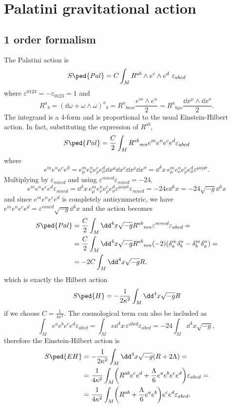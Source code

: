 \documentclass[a4paper,12pt]{book}
\begin{document}
\section{Palatini gravitational action}
\subsection{1 order formalism}
\label{subsec:pal1vierbein}
The Palatini action is 
\[S\ped{Pal}=C\int_MR^{ab}\wedge e^c\wedge e^d\ \varepsilon_{abcd}\]
where $\varepsilon^{0123}=-\varepsilon_{0123}=1$ and
\[R^a{}_b=(\dd\omega+\omega\wedge\omega)^a{}_b=R^a{}_{bmn}\frac{e^m\wedge e^n}{2}=R^a{}_{b\mu\nu}\frac{\dd x^\mu\wedge\dd x^\nu}{2}.\]
The integrand is a 4-form and is proportional to the usual Einstein-Hilbert action. In fact, substituting the expression of $R^{ab}$,
\[S\ped{Pal}=\frac{C}{2}\int_MR^{ab}{}_{mn}e^me^ne^ce^d\varepsilon_{abcd}\]
where
\[e^me^ne^ce^d=e^m_\mu e^n_\nu e^c_\rho e^d_\sigma\dd x^\mu\dd x^\nu\dd x^\rho\dd x^\sigma=\dd^4x\,e^m_\mu e^n_\nu e^c_\rho e^d_\sigma \varepsilon^{\mu\nu\rho\sigma}.\]
Multiplying by $\varepsilon_{mncd}$ and using $\varepsilon^{mncd}\varepsilon_{mncd}=-24$,
\[e^me^ne^ce^d\varepsilon_{mncd}=\dd^4x\,e^m_\mu e^n_\nu e^c_\rho e^d_\sigma \varepsilon^{\mu\nu\rho\sigma}\varepsilon_{mncd}=-24e\dd^4 x=-24\sqrt{-g}\dd^4x\]
and since $e^me^ne^ce^d$ is completely antisymmetric, we have $e^me^ne^ce^d=\varepsilon^{mncd}\sqrt{-g}\dd^4x$ and the action becomes
\begin{align*}
S\ped{Pal}&=\frac{C}{2}\int_M\dd^4x\sqrt{-g}R^{ab}{}_{mn}\varepsilon^{mncd}\varepsilon_{abcd}=\\
&=\frac{C}{2}\int_M\dd^4x\sqrt{-g}R^{ab}{}_{mn}(-2)(\delta^m_a\delta^n_b-\delta^m_b\delta^n_a)=\\
&=-2C\int_M\dd^4x\sqrt{-g}R,
\end{align*}
which is exactly the Hilbert action
\[S\ped{H}=-\frac{1}{2\kappa^2}\int_M\dd^4x\sqrt{-g}R\]
if we choose $C=\frac{1}{4\kappa^2}$. The cosmological term can also be included as
\[\int_Me^ae^be^ce^d\varepsilon_{abcd}=\int_M e\dd^4x\,\varepsilon^{abcd}\varepsilon_{abcd}=-24\int_M\dd^4x\sqrt{-g},\]
therefore the Einstein-Hilbert action is
\begin{align}
\label{eqn:palatinieh}
S\ped{EH}&=-\frac{1}{2\kappa^2}\int_M\dd^4x\sqrt{-g}(R+2\Lambda)=\\
&=\frac{1}{4\kappa^2}\int_M\biggl(R^{ab}e^ce^d+\frac{\Lambda}{6}e^ae^be^ce^d\biggr)\varepsilon_{abcd}=\\
&=\frac{1}{4\kappa^2}\int_M\biggl(R^{ab}+\frac{\Lambda}{6}e^ae^b\biggr)e^ce^d\varepsilon_{abcd}.
\end{align}
\end{document}
